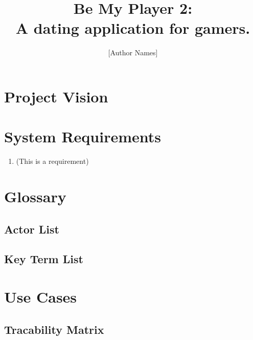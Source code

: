 \documentclass[12pt, draft]{article}
\title{Be My Player 2: \\ A dating application for gamers.}
\author{[Author Names]}
\begin{document}
\maketitle \pagebreak



\section{Project Vision}

\section{System Requirements}
\begin{enumerate}
\item (This is a requirement)
\end{enumerate}

\section{Glossary}
\subsection{Actor List}

\subsection{Key Term List}

\section{Use Cases}

\subsection*{Tracability Matrix}
\end{document}
